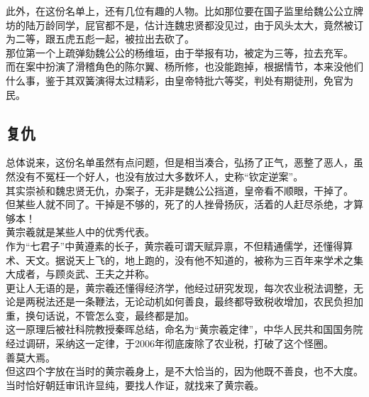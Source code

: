 \begin{multicols}{\theparacolNo}
此外，在这份名单上，还有几位有趣的人物。比如那位要在国子监里给魏公公立牌坊的陆万龄同学，屁官都不是，估计连魏忠贤都没见过，由于风头太大，竟然被订为二等，跟五虎五彪一起，被拉出去砍了。\\

那位第一个上疏弹劾魏公公的杨维垣，由于举报有功，被定为三等，拉去充军。\\

而在案中扮演了滑稽角色的陈尔翼、杨所修，也没能跑掉，根据情节，本来没他们什么事，鉴于其双簧演得太过精彩，由皇帝特批六等奖，判处有期徒刑，免官为民。\\

\subsection{复仇}
总体说来，这份名单虽然有点问题，但是相当凑合，弘扬了正气，恶整了恶人，虽然没有不冤枉一个好人，也没有放过大多数坏人，史称“钦定逆案”。\\

其实崇祯和魏忠贤无仇，办案子，无非是魏公公挡道，皇帝看不顺眼，干掉了。\\

但某些人就不同了。干掉是不够的，死了的人挫骨扬灰，活着的人赶尽杀绝，才算够本！\\

黄宗羲就是某些人中的优秀代表。\\

作为“七君子”中黄遵素的长子，黄宗羲可谓天赋异禀，不但精通儒学，还懂得算术、天文。据说天上飞的，地上跑的，没有他不知道的，被称为三百年来学术之集大成者，与顾炎武、王夫之并称。\\

更让人无语的是，黄宗羲还懂得经济学，他经过研究发现，每次农业税法调整，无论是两税法还是一条鞭法，无论动机如何善良，最终都导致税收增加，农民负担加重，换句话说，不管怎么变，最终都是加。\\

这一原理后被社科院教授秦晖总结，命名为“黄宗羲定律”，中华人民共和国国务院经过调研，采纳这一定律，于2006年彻底废除了农业税，打破了这个怪圈。\\

善莫大焉。\\

但这四个字放在当时的黄宗羲身上，是不大恰当的，因为他既不善良，也不大度。\\

当时恰好朝廷审讯许显纯，要找人作证，就找来了黄宗羲。\\


\end{multicols}
